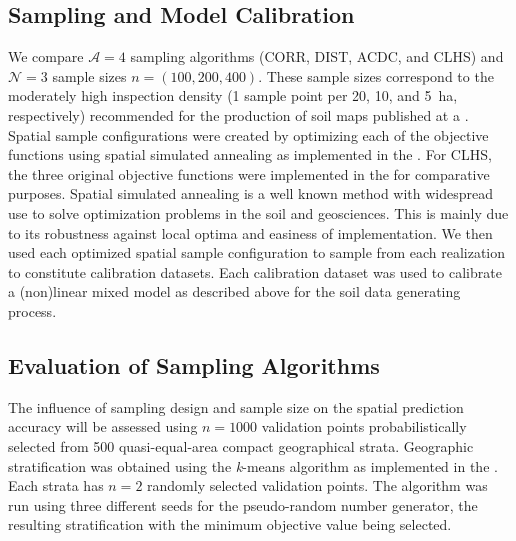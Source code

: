 \subsection{Sampling and Model Calibration}

We compare $\mathcal{A} = 4$ sampling algorithms (CORR, DIST, ACDC, and CLHS) and $\mathcal{N} = 3$ 
sample sizes $n = (100, 200, 400)$. These sample sizes correspond to the moderately high inspection density (1 
sample point per 20, 10, and \SI{5}{\hectare}, respectively) recommended for the production of soil maps 
published 
at a  \cite{Rossiter2000}. Spatial sample configurations were created by optimizing each of the 
objective functions using spatial simulated annealing as implemented in the . For CLHS, the 
three original objective functions were implemented in the  for comparative purposes. Spatial 
simulated annealing is a well known method with widespread use to solve optimization problems in the soil and 
geosciences. This is mainly due to its robustness against local optima and easiness of implementation. We then 
used each optimized spatial sample configuration to sample from each realization to constitute calibration 
datasets. Each calibration dataset was used to calibrate a (non)linear mixed model as described above for the 
soil data generating process.

\subsection{Evaluation of Sampling Algorithms}

The influence of sampling design and sample size on the spatial prediction accuracy will be assessed using 
$n = 1000$ validation points probabilistically selected from 500 quasi-equal-area compact geographical strata. 
Geographic stratification was obtained using the \textit{k}-means algorithm as implemented in the 
 \cite{WalvoortEtAl2010}. Each strata has $n = 2$ randomly selected validation points. The 
algorithm was run using three different seeds for the pseudo-random number generator, the resulting 
stratification with the minimum objective value being selected.

